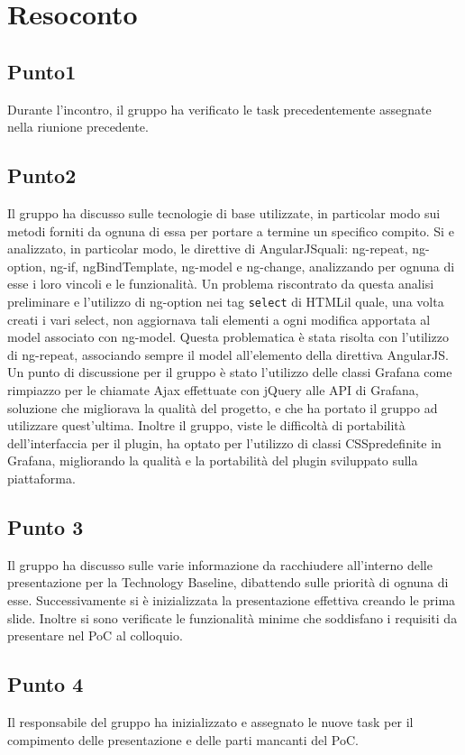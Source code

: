 \section{Resoconto}

\subsection{Punto1}
Durante l'incontro, il gruppo ha verificato le task precedentemente assegnate nella riunione precedente. 

\subsection{Punto2}
Il gruppo ha discusso sulle tecnologie di base utilizzate, in particolar modo sui metodi forniti da ognuna di essa per portare a termine un specifico compito. Si e analizzato, in particolar modo, le direttive di AngularJS\glossario quali: ng-repeat, ng-option, ng-if, ngBindTemplate, ng-model e ng-change, analizzando per ognuna di esse i loro vincoli e le funzionalità. Un problema riscontrato da questa analisi preliminare e l'utilizzo di ng-option nei tag \texttt{select} di HTML\glossario il quale, una volta creati i vari select, non aggiornava tali elementi a ogni modifica apportata al model associato con ng-model. Questa problematica è stata risolta con l'utilizzo di ng-repeat, associando sempre il model all'elemento della direttiva AngularJS. Un punto di discussione per il gruppo è stato l'utilizzo delle classi Grafana come rimpiazzo per le chiamate Ajax effettuate con jQuery alle API di Grafana, soluzione che migliorava la qualità del progetto, e che ha portato il gruppo ad utilizzare quest'ultima. Inoltre il gruppo, viste le difficoltà di portabilità dell'interfaccia per il plugin, ha optato per l'utilizzo di classi CSS\glossario predefinite in Grafana, migliorando la qualità e la portabilità del plugin sviluppato sulla piattaforma. 

\subsection{Punto 3}
Il gruppo ha discusso sulle varie informazione da racchiudere all'interno delle presentazione per la Technology Baseline, dibattendo sulle priorità di ognuna di esse. Successivamente si è inizializzata la presentazione effettiva creando le prima slide. Inoltre si sono verificate le funzionalità minime che soddisfano i requisiti da presentare nel PoC al colloquio. 

\subsection{Punto 4}
Il responsabile del gruppo ha inizializzato e assegnato le nuove task per il compimento delle presentazione e delle parti mancanti del PoC. 
